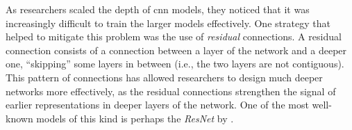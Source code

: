 
As researchers scaled the depth of \gls{cnn} models, they
noticed that it was increasingly difficult to train the
larger models effectively. One strategy that helped to
mitigate this problem was the use of \emph{residual}
connections. A residual connection consists of a connection
between a layer of the network and a deeper one,
``skipping'' some layers in between (i.e., the two layers
are not contiguous). This pattern of connections has allowed
researchers to design much deeper networks more effectively,
as the residual connections strengthen the signal of earlier
representations in deeper layers of the network. One of the
most well-known models of this kind is perhaps the
\emph{ResNet} by \textcite{he2016deep}.
